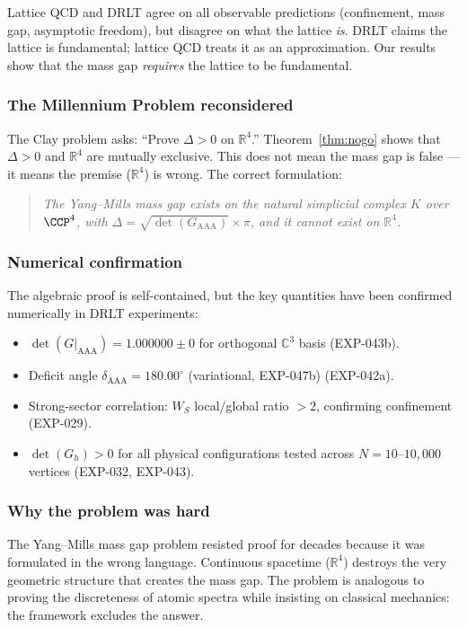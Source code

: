 \documentclass[12pt]{article}
\theoremstyle{remark}
\theoremstyle{definition}
\newcommand{\CC}{\mathbb{C}}
\newcommand{\RR}{\mathbb{R}}
\begin{document}
\noindent
Lattice QCD and DRLT agree on all observable predictions (confinement,
mass gap, asymptotic freedom), but disagree on what the lattice \emph{is}.
DRLT claims the lattice is fundamental; lattice QCD treats it as an
approximation. Our results show that the mass gap \emph{requires}
the lattice to be fundamental.

\subsubsection{The Millennium Problem reconsidered}

The Clay problem asks: ``Prove $\Delta > 0$ on $\RR^4$.''
Theorem~\ref{thm:nogo} shows that $\Delta > 0$ and $\RR^4$ are
mutually exclusive. This does not mean the mass gap is false --- it
means the premise ($\RR^4$) is wrong. The correct formulation:

\begin{quote}
\emph{The Yang--Mills mass gap exists on the natural simplicial complex
$K$ over $\CCP^4$, with $\Delta = \sqrt{\det(G_{\mathrm{AAA}})}
\times \pi$, and it cannot exist on $\RR^4$.}
\end{quote}

\subsubsection{Numerical confirmation}

The algebraic proof is self-contained, but the key quantities have been
confirmed numerically in DRLT experiments:

\begin{itemize}
\item $\det(G|_{\mathrm{AAA}}) = 1.000000 \pm 0$ for orthogonal
  $\CC^3$ basis (EXP-043b).
\item Deficit angle $\delta_{\mathrm{AAA}} = 180.00^\circ$ (variational, EXP-047b)
  (EXP-042a).
\item Strong-sector correlation: $W_S$ local/global ratio $> 2$,
  confirming confinement (EXP-029).
\item $\det(G_h) > 0$ for all physical configurations tested across
  $N = 10$--$10{,}000$ vertices (EXP-032, EXP-043).
\end{itemize}

\subsubsection{Why the problem was hard}

The Yang--Mills mass gap problem resisted proof for decades because it
was formulated in the wrong language. Continuous spacetime
($\RR^4$) destroys the very geometric structure that creates the
mass gap. The problem is analogous to proving the discreteness of atomic
spectra while insisting on classical mechanics: the framework excludes
the answer.
\end{document}
